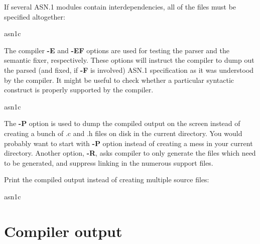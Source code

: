 \documentclass[english,oneside,12pt]{book}
\begin{document}
If several ASN.1 modules contain interdependencies, all of the files
must be specified altogether:
\begin{bash}
asn1c %
\end{bash}
The compiler \textbf{-E} and \textbf{-EF} options are used for testing
the parser and the semantic fixer, respectively. These options will
instruct the compiler to dump out the parsed (and fixed, if \textbf{-F}
is involved) ASN.1 specification as it was understood
by the compiler. It might be useful to check whether a particular
syntactic construct is properly supported by the compiler.
\begin{bash}
asn1c %
\end{bash}
The \textbf{-P} option is used to dump the compiled output on the
screen instead of creating a bunch of .c and .h files on disk in the
current directory. You would probably want to start with \textbf{-P}
option instead of creating a mess in your current directory. Another
option, \textbf{-R}, asks compiler to only generate the files which
need to be generated, and suppress linking in the numerous support
files.

Print the compiled output instead of creating multiple source files:
\begin{bash}
asn1c %
\end{bash}

\clearpage{}
\section{Compiler output}
\end{document}
